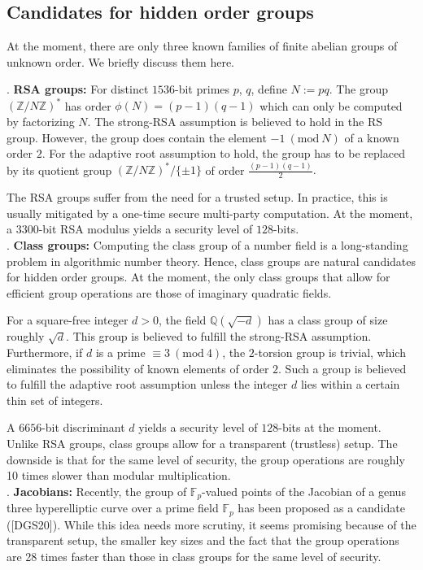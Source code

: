 \documentclass[11pt, lettersize, notitlepage, leqno, footskip=0.6cm]{article}
\newcommand{\bz}{\mathbb Z}
\newcommand{\bq}{\mathbb Q}
\newcommand{\bFp}{\mathbb{F}_p}
\newcommand{\Mod}[1]{\ (\mathrm{mod}\ #1)}
\numberwithin{equation}{section}
\begin{document}
\subsection{\fontsize{11}{11}\selectfont Candidates for hidden order groups }

At the moment, there are only three known families of finite abelian groups of unknown order. We briefly discuss them here.\vspace{0.1cm}

. \textbf{RSA groups:} For distinct $1536$-bit primes $p$, $q$, define $N:= pq$. The group $(\bz/N\bz)^*$ has order $\phi(N) = (p-1)(q-1)$ which can only be computed by factorizing $N$. The strong-RSA assumption is believed to hold in the RS group. However, the group does contain the element $-1\Mod{N}$ of a known order $2$. For the adaptive root assumption to hold, the group has to be replaced by its quotient group $(\bz/N\bz)^*/\{\pm 1\}$ of order $\frac{(p-1)(q-1)}{2}.$ 

The RSA groups suffer from the need for a trusted setup. In practice, this is usually mitigated by a one-time secure multi-party computation. At the moment, a $3300$-bit RSA modulus yields a security level of $128$-bits.\\


. \textbf{Class groups:} Computing the class group of a number field is a long-standing problem in algorithmic number theory. Hence, class groups are natural candidates for hidden order groups. At the moment, the only class groups that allow for efficient group operations are those of imaginary quadratic fields.

For a square-free integer $d > 0$, the field $\bq(\sqrt{-d})$ has a class group of size roughly $\sqrt{d}$. This group is believed to fulfill the strong-RSA assumption. Furthermore, if $d$ is a prime $\equiv 3 \Mod{4}$, the $2$-torsion group is trivial, which eliminates the possibility of known elements of order $2$. Such a group is believed to fulfill the adaptive root assumption unless the integer $d$ lies within a certain thin set of integers.

A $6656$-bit discriminant $d$ yields a security level of $128$-bits at the moment. Unlike RSA groups, class groups allow for a transparent (trustless) setup. The downside is that for the same level of security, the group operations are roughly 10 times slower than modular multiplication.\\

. \textbf{Jacobians:} Recently, the group of $\bFp$-valued points of the Jacobian of a genus three hyperelliptic curve over a prime field $\bFp$ has been proposed as a candidate ([DGS20]). While this idea needs more scrutiny, it seems promising because of the transparent setup, the smaller key sizes and the fact that the group operations are 28 times faster than those in class groups for the same level of security.
\end{document}
